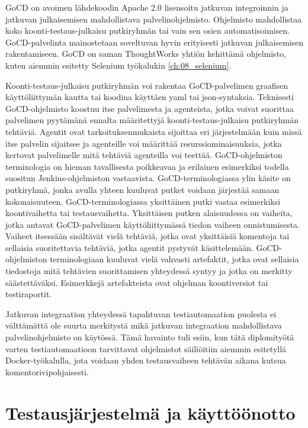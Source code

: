     GoCD on avoimen lähdekoodin Apache 2.0 lisensoitu jatkuvan integroinnin ja jatkuvan julkaisemisen mahdollistava palvelinohjelmisto.
    Ohjelmisto mahdollistaa koko koonti-testaus-julkaisu putkiryhmän tai vain sen osien automatisoimisen.
    GoCD-palvelinta mainostetaan soveltuvan hyvin erityisesti jatkuvan julkaisemisen rakentamiseen.
    GoCD on saman ThoughtWorks yhtiön kehittämä ohjelmisto, kuten aiemmin esitetty Selenium työkalukin \ref{ch:08_selenium}.

    Koonti-testaus-julkaisu putkiryhmän voi rakentaa GoCD-palvelimen graafisen käyttöliittymän kautta tai koodina käyttäen yaml tai json-syntaksia.
    Teknisesti GoCD-ohjelmisto koostuu itse palvelimesta ja agenteista, jotka voivat suorittaa palvelimen pyytämänä ennalta määritettyjä koonti-testaus-julkaisu putkiryhmän tehtäviä.
    Agentit ovat tarkoituksenmukaista sijoittaa eri järjestelmään kuin missä itse palvelin sijaitsee ja agenteille voi määrittää resurssiominaisuuksia, jotka kertovat palvelimelle mitä tehtäviä agenteilla voi teettää.
    GoCD-ohjelmiston terminologia on hieman tavallisesta poikkeavaa ja erilainen esimerkiksi todella suositun Jenkins-ohjelmiston vastaavista.
    GoCD-terminologiassa ylin käsite on putkiryhmä, jonka avulla yhteen kuuluvat putket voidaan järjestää samaan kokonaisuuteen.
    GoCD-terminologiassa yksittäinen putki vastaa esimerkiksi koontivaihetta tai testausvaihetta.
    Yksittäisen putken alaisuudessa on vaiheita, jotka antavat GoCD-palvelimen käyttöliittymässä tiedon vaiheen onnistumisesta.
    Vaiheet itsessään sisältävät vielä tehtäviä, jotka ovat yksittäisiä komentoja tai sellaisia suoritettavia tehtäviä, jotka agentit pystyvät käsittelemään.
    GoCD-ohjelmiston terminologiaan kuuluvat vielä vahvasti artefaktit, jotka ovat sellaisia tiedostoja mitä tehtävien suorittamisen yhteydessä syntyy ja jotka on merkitty säästettäväksi.
    Esimerkkejä artefakteista ovat ohjelman koontiversiot tai testiraportit.

    Jatkuvan integraation yhteydessä tapahtuvan testiautomaation puolesta ei välttämättä ole suurta merkitystä mikä jatkuvan integraation mahdollistava palvelinohjelmisto on käytössä.
    Tämä havainto tuli esiin, kun tätä diplomityötä varten testiautomaatioon tarvittavat ohjelmistot säiliöitiin aiemmin esitetyllä Docker-työkalulla, jota voidaan yhden testausvaiheen tehtävän aikana kutsua komentorivipohjaisesti.

\section{Testausjärjestelmä ja käyttöönotto} \label{ch:08_testausjarjestelma_ja_kayttoonotto}

